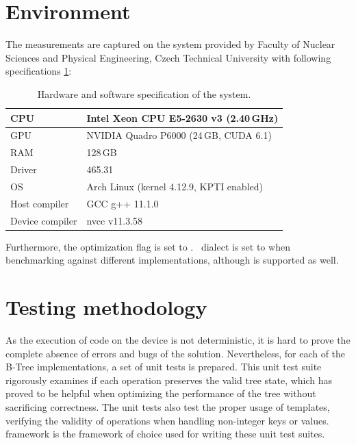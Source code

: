\section{Environment}

The measurements are captured on the  system provided by Faculty of Nuclear Sciences and Physical Engineering, Czech Technical University with following specifications \ref{table:env-gp1}:

\begin{table}[H]
  \centering
  \begin{tabular}{ | l | l | }
    \hline
    CPU             & Intel Xeon CPU E5-2630 v3 (2.40\,GHz)    \\
    \hline
    GPU             & NVIDIA Quadro P6000 (24\,GB, CUDA 6.1)   \\
    \hline
    RAM             & 128\,GB                                  \\
    \hline
    Driver          & 465.31                                   \\
    \hline
    OS              & Arch Linux (kernel 4.12.9, KPTI enabled) \\
    \hline
    Host compiler   & GCC g++ 11.1.0                           \\
    \hline
    Device compiler & nvcc v11.3.58                            \\
    \hline
  \end{tabular}
  \caption{Hardware and software specification of the  system.}
  \label{table:env-gp1}
\end{table}

Furthermore, the optimization flag is set to . \CC\ dialect is set to  when benchmarking against different implementations, although  is supported as well.

\section{Testing methodology}

As the execution of code on the device is not deterministic, it is hard to prove the complete absence of errors and bugs of the solution. Nevertheless, for each of the B-Tree implementations, a set of unit tests is prepared. This unit test suite rigorously examines if each operation preserves the valid tree state, which has proved to be helpful when optimizing the performance of the tree without sacrificing correctness. The unit tests also test the proper usage of templates, verifying the validity of operations when handling non-integer keys or values.  framework \cite{gtest} is the framework of choice used for writing these unit test suites.

